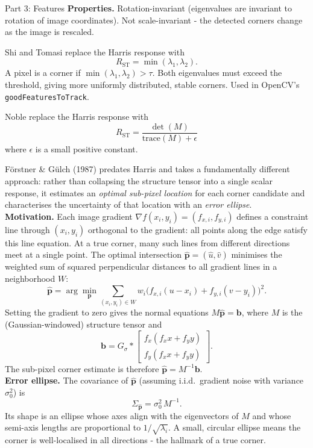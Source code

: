 \documentclass[letterpaper]{article}
\begin{document}
\begin{notes}{Part 3: Features}
\textbf{Properties.} Rotation-invariant (eigenvalues are invariant to rotation of image coordinates). Not scale-invariant - the detected corners change as the image is rescaled.


Shi and Tomasi replace the Harris response with
$$R_{\mathrm{ST}} = \min(\lambda_1, \lambda_2).$$
A pixel is a corner if $\min(\lambda_1,\lambda_2) > \tau$. Both eigenvalues must exceed the threshold, giving more uniformly distributed, stable corners. Used in OpenCV's \texttt{goodFeaturesToTrack}.


Noble replace the Harris response with
$$R_{\mathrm{ST}} = \frac{\det(M)}{\mathrm{trace}(M) + \epsilon}$$
where $\epsilon$ is a small positive constant.



Förstner \& Gülch (1987) predates Harris and takes a fundamentally different approach: rather than collapsing the structure tensor into a single scalar response, it estimates an \emph{optimal sub-pixel location} for each corner candidate and characterises the uncertainty of that location with an \emph{error ellipse}.\\

\textbf{Motivation.} Each image gradient $\nabla f(x_i, y_i) = (f_{x,i}, f_{y,i})$ defines a constraint line through $(x_i, y_i)$ orthogonal to the gradient: all points along the edge satisfy this line equation. At a true corner, many such lines from different directions meet at a single point. The optimal intersection $\hat{\mathbf{p}} = (\hat{u}, \hat{v})$ minimises the weighted sum of squared perpendicular distances to all gradient lines in a neighborhood $W$:
$$\hat{\mathbf{p}} = \arg\min_{\mathbf{p}} \sum_{(x_i,y_i)\in W} w_i \bigl(f_{x,i}(u-x_i)+f_{y,i}(v-y_i)\bigr)^2.$$
Setting the gradient to zero gives the normal equations $M\hat{\mathbf{p}} = \mathbf{b}$, where $M$ is the (Gaussian-windowed) structure tensor and
$$\mathbf{b} = G_\sigma * \begin{bmatrix}f_x(f_x x + f_y y)\\ f_y(f_x x + f_y y)\end{bmatrix}.$$
The sub-pixel corner estimate is therefore $\hat{\mathbf{p}} = M^{-1}\mathbf{b}$.\\

\textbf{Error ellipse.} The covariance of $\hat{\mathbf{p}}$ (assuming i.i.d.\ gradient noise with variance $\sigma_0^2$) is
$$\Sigma_{\hat{\mathbf{p}}} = \sigma_0^2\,M^{-1}.$$
Its shape is an ellipse whose axes align with the eigenvectors of $M$ and whose semi-axis lengths are proportional to $1/\sqrt{\lambda_i}$. A small, circular ellipse means the corner is well-localised in all directions - the hallmark of a true corner.\\


\end{notes}
\end{document}

